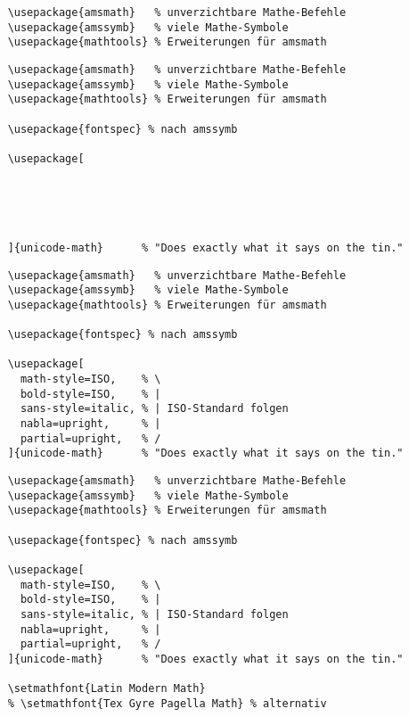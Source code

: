 \newsavebox{\mathfontsone}
\newsavebox{\mathfontstwo}
\newsavebox{\mathfontsthree}
\newsavebox{\mathfontsfour}

\begin{lrbox}{\mathfontsone}
  \begin{lstlisting}
    \usepackage{amsmath}   % unverzichtbare Mathe-Befehle
    \usepackage{amssymb}   % viele Mathe-Symbole
    \usepackage{mathtools} % Erweiterungen für amsmath
  \end{lstlisting}
\end{lrbox}

\begin{lrbox}{\mathfontstwo}
  \begin{lstlisting}
    \usepackage{amsmath}   % unverzichtbare Mathe-Befehle
    \usepackage{amssymb}   % viele Mathe-Symbole
    \usepackage{mathtools} % Erweiterungen für amsmath

    \usepackage{fontspec} % nach amssymb

    \usepackage[





    ]{unicode-math}      % "Does exactly what it says on the tin."
  \end{lstlisting}
\end{lrbox}

\begin{lrbox}{\mathfontsthree}
  \begin{lstlisting}
    \usepackage{amsmath}   % unverzichtbare Mathe-Befehle
    \usepackage{amssymb}   % viele Mathe-Symbole
    \usepackage{mathtools} % Erweiterungen für amsmath

    \usepackage{fontspec} % nach amssymb

    \usepackage[
      math-style=ISO,    % \
      bold-style=ISO,    % |
      sans-style=italic, % | ISO-Standard folgen
      nabla=upright,     % |
      partial=upright,   % /
    ]{unicode-math}      % "Does exactly what it says on the tin."
  \end{lstlisting}
\end{lrbox}

\begin{lrbox}{\mathfontsfour}
  \begin{lstlisting}
    \usepackage{amsmath}   % unverzichtbare Mathe-Befehle
    \usepackage{amssymb}   % viele Mathe-Symbole
    \usepackage{mathtools} % Erweiterungen für amsmath

    \usepackage{fontspec} % nach amssymb

    \usepackage[
      math-style=ISO,    % \
      bold-style=ISO,    % |
      sans-style=italic, % | ISO-Standard folgen
      nabla=upright,     % |
      partial=upright,   % /
    ]{unicode-math}      % "Does exactly what it says on the tin."

    \setmathfont{Latin Modern Math}
    % \setmathfont{Tex Gyre Pagella Math} % alternativ
  \end{lstlisting}
\end{lrbox}

